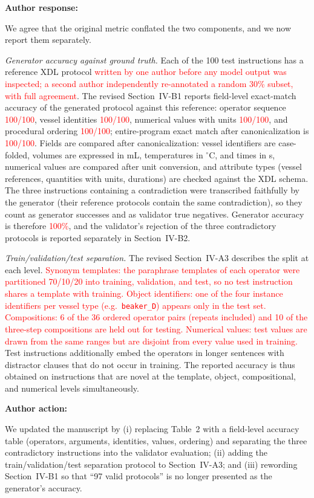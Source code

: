 \documentclass[11pt]{article}
\newcommand{\nd}[1]{\textcolor{red}{#1}}
\newenvironment{response}{\textbf{Author response:}\par\smallskip}{\par\medskip}
\newenvironment{action}{\textbf{Author action:}\par\smallskip}{\par\bigskip\noindent\hrulefill\par\bigskip}
\begin{document}
\begin{response}
We agree that the original metric conflated the two components, and we now report them separately.

\emph{Generator accuracy against ground truth.}
Each of the 100 test instructions has a reference XDL protocol \nd{written by one author before any model output was inspected; a second author independently re-annotated a random 30\% subset, with full agreement}.
The revised Section~IV-B1 reports field-level exact-match accuracy of the generated protocol against this reference: operator sequence \nd{100/100}, vessel identities \nd{100/100}, numerical values with units \nd{100/100}, and procedural ordering \nd{100/100}; entire-program exact match after canonicalization is \nd{100/100}.
Fields are compared after canonicalization: vessel identifiers are case-folded, volumes are expressed in mL, temperatures in $^\circ$C, and times in s, numerical values are compared after unit conversion, and attribute types (vessel references, quantities with units, durations) are checked against the XDL schema.
The three instructions containing a contradiction were transcribed faithfully by the generator (their reference protocols contain the same contradiction), so they count as generator successes and as validator true negatives.
Generator accuracy is therefore \nd{100\%}, and the validator's rejection of the three contradictory protocols is reported separately in Section~IV-B2.

\emph{Train/validation/test separation.}
The revised Section~IV-A3 describes the split at each level.
\nd{Synonym templates: the paraphrase templates of each operator were partitioned 70/10/20 into training, validation, and test, so no test instruction shares a template with training.
Object identifiers: one of the four instance identifiers per vessel type (e.g.\ \texttt{beaker\_D}) appears only in the test set.
Compositions: 6 of the 36 ordered operator pairs (repeats included) and 10 of the three-step compositions are held out for testing.
Numerical values: test values are drawn from the same ranges but are disjoint from every value used in training.}
Test instructions additionally embed the operators in longer sentences with distractor clauses that do not occur in training.
The reported accuracy is thus obtained on instructions that are novel at the template, object, compositional, and numerical levels simultaneously.
\end{response}

\begin{action}
We updated the manuscript by
(i) replacing Table~2 with a field-level accuracy table (operators, arguments, identities, values, ordering) and separating the three contradictory instructions into the validator evaluation;
(ii) adding the train/validation/test separation protocol to Section~IV-A3;
and (iii) rewording Section~IV-B1 so that ``97 valid protocols'' is no longer presented as the generator's accuracy.
\end{action}
\end{document}
